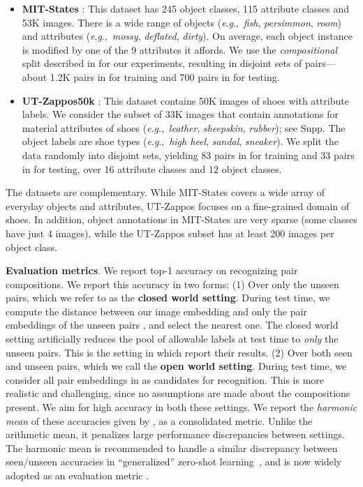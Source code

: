 \documentclass[runningheads]{llncs}
\newcommand{\eg}{\textit{e}.\textit{g}.,~}
\begin{document}
\begin{itemize}
\item \textbf{MIT-States} \cite{isola2015discovering}: This dataset has 245 object classes, 115 attribute classes and
53K images.  There is a wide range of objects (\eg \emph{fish}, \emph{persimmon}, \emph{room}) and attributes (\eg \emph{mossy}, \emph{deflated}, \emph{dirty}). On average, each object instance is modified by one of the 9 attributes it affords. We use the \emph{compositional} split described in \cite{misra2017red} for our experiments, resulting in disjoint sets of pairs---about 1.2K pairs in  for training and 700 pairs in  for testing. 
\vspace*{0.1in}

\item \textbf{UT-Zappos50k} \cite{yu2017semantic}: This dataset contains 50K images of shoes with attribute labels. We consider the subset of 33K images that contain annotations for material attributes of shoes (\eg \emph{leather}, \emph{sheepskin}, \emph{rubber}); see Supp.  
The object labels are shoe types (\eg \emph{high heel}, \emph{sandal}, \emph{sneaker}). 
We split the data randomly into disjoint sets, yielding 83 pairs in  for training and 33 pairs in  for testing, over 16 attribute classes and 12 object classes.\end{itemize}

The datasets are complementary.  While MIT-States covers a wide array of everyday objects and attributes, UT-Zappos focuses on a fine-grained domain of shoes. In addition, object annotations in MIT-States are very sparse (some classes have just 4 images), while the UT-Zappos subset has at least 200 images per object class. 

\vspace{0.05in}
\noindent\textbf{Evaluation metrics}. We report top-1 accuracy on recognizing pair compositions. We report this accuracy in two forms: (1) Over only the unseen pairs, which we refer to as the \textbf{closed world setting}.  During test time, we compute the distance between our image embedding and only the pair embeddings of the unseen pairs , and select the nearest one. The closed world setting artificially reduces the pool of allowable labels at test time to \emph{only} the unseen pairs. This is the setting in which \cite{misra2017red} report their results.
(2) Over both seen and unseen pairs, which we call the \textbf{open world setting}.  During test time, we consider all pair embeddings in  as candidates for recognition. This is more realistic and challenging, since no assumptions are made about the compositions present. We aim for high accuracy in both these settings. We report the \emph{harmonic mean} of these accuracies given by , as a consolidated metric. Unlike the arithmetic mean, it penalizes large performance discrepancies between settings. The harmonic mean is recommended to handle a similar discrepancy between seen/unseen accuracies in ``generalized'' zero-shot learning~\cite{xian2017zero}, and is now widely adopted as an evaluation metric \cite{verma2018generalized,xian2018feature,chen2018zero,wang2017alternative}.
\end{document}
